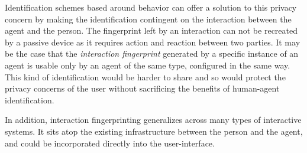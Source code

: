 \documentclass[conference]{IEEEtran}
\newcommand{\meta}[1]{{\textcolor[rgb]{0.1,0.7,0.2}{[JSS: {\it #1}]}}}
\begin{document}
Identification schemes based around behavior can offer a solution to this privacy concern by making the identification contingent on the interaction between the agent and the person. The fingerprint left by an interaction can not be recreated by a passive device as it requires action and reaction between two parties. It may be the case that the \textit{interaction fingerprint} generated by a specific instance of an agent is usable only by an agent of the same type, configured in the same way. This kind of identification would be harder to share and so would protect the privacy concerns of the user without sacrificing the benefits of human-agent identification. 

In addition, interaction fingerprinting generalizes across many types of interactive systems. It sits atop the existing infrastructure between the person and the agent, and could be incorporated directly into the user-interface. 


\end{document}
